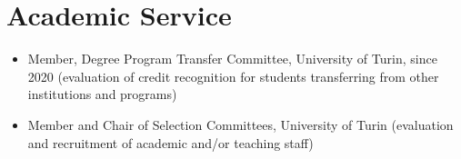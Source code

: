 \section*{Academic Service}

\begin{itemize}
  \item Member, Degree Program Transfer Committee, University of Turin, since 2020  
  (evaluation of credit recognition for students transferring from other institutions and programs)

  \item Member and Chair of Selection Committees, University of Turin  
  (evaluation and recruitment of academic and/or teaching staff)
\end{itemize}